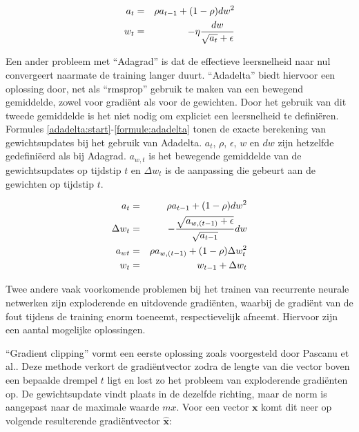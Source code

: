 \begin{eqnarray}
\vspace{-3mm}
    \label{rmsprop:start}
    a_t & = & \rho  a_{t-1} + (1 - \rho)dw^2 \\
    w_t & = &  - \eta \frac{dw}{\sqrt{a_t} + \epsilon}
    \label{formule:rmsprop}
    \vspace{-3mm}
\end{eqnarray}

Een ander probleem met ``Adagrad'' is dat de effectieve leersnelheid naar nul convergeert naarmate de training langer duurt. ``Adadelta''\cite{Zeiler2012} biedt hiervoor een oplossing door, net als ``rmsprop'' gebruik te maken van een bewegend gemiddelde, zowel voor gradi\"ent als voor de gewichten. Door het gebruik van dit tweede gemiddelde is het niet nodig om expliciet een leersnelheid te defini\"eren. Formules \eqref{adadelta:start}-\eqref{formule:adadelta} tonen de exacte berekening van gewichtsupdates bij het gebruik van Adadelta. $a_t$, $\rho$, $\epsilon$, $w$ en $dw$ zijn hetzelfde gedefini\"eerd als bij Adagrad. $a_{w,t}$ is het bewegende gemiddelde van de gewichtsupdates op tijdstip $t$ en $\Delta w_t$ is de aanpassing die gebeurt aan de gewichten op tijdstip $t$.

\begin{eqnarray}
\vspace{-3mm}
    \label{adadelta:start}
    a_t & = & \rho  a_{t-1} + (1 - \rho)dw^2 \\
    \Delta w_t & = & - \frac{\sqrt{a_{w,(t-1)} + \epsilon}}{\sqrt{a_{t-1}}}dw \\
    a_{wt} & = & \rho  a_{w,(t-1)} + (1 - \rho)\Delta w_t^2 \\
    w_t & = & w_{t-1} + \Delta w_t
    \label{formule:adadelta}
    \vspace{-3mm}
\end{eqnarray}


Twee andere vaak voorkomende problemen bij het trainen van recurrente neurale netwerken zijn exploderende en uitdovende gradi\"enten, waarbij de gradi\"ent van de fout tijdens de training enorm toeneemt, respectievelijk afneemt. Hiervoor zijn een aantal mogelijke oplossingen.

``Gradient clipping'' vormt een eerste oplossing zoals voorgesteld door Pascanu et al.\cite{Pascanu2012}. Deze methode verkort de gradi\"entvector zodra de lengte van die vector boven een bepaalde drempel $t$ ligt en lost zo het probleem van exploderende gradi\"enten op. De gewichtsupdate vindt plaats in de dezelfde richting, maar de norm is aangepast naar de maximale waarde $mx$. Voor een vector $\mathbf{x}$ komt dit neer op volgende resulterende gradi\"entvector $\mathbf{\hat{x}}$:

